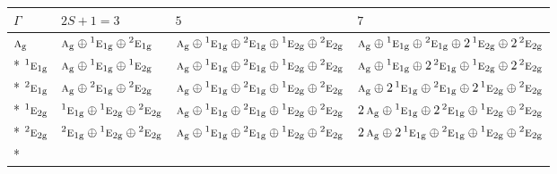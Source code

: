 \documentclass[10pt,a4paper]{article}
\numberwithin{equation}{section}
\newcommand{\irr}[1]{\text{\normalfont\scshape #1}}
\newcommand{\conjpair}[1]{{}^{#1}}
\newcommand{\ptag}[1]{\mathrm{#1}}
\begin{document}
{\small\setlength{\tabcolsep}{3pt}\begin{longtable}{@{}llll@{}}\toprule
$\Gamma$ & $2S + 1 = 3$ & $5$ & $7$\\\midrule\endhead
\bottomrule\endfoot\endlastfoot
$\irr{a}_{\ptag{g}}$ & $\irr{a}_{\ptag{g}}\oplus \conjpair{1}\irr{e}_{1\ptag{g}}\oplus \conjpair{2}\irr{e}_{1\ptag{g}}$ & $\irr{a}_{\ptag{g}}\oplus \conjpair{1}\irr{e}_{1\ptag{g}}\oplus \conjpair{2}\irr{e}_{1\ptag{g}}\oplus \conjpair{1}\irr{e}_{2\ptag{g}}\oplus \conjpair{2}\irr{e}_{2\ptag{g}}$ & $\irr{a}_{\ptag{g}}\oplus \conjpair{1}\irr{e}_{1\ptag{g}}\oplus \conjpair{2}\irr{e}_{1\ptag{g}}\oplus 2\,\conjpair{1}\irr{e}_{2\ptag{g}}\oplus 2\,\conjpair{2}\irr{e}_{2\ptag{g}}$\\*
$\conjpair{1}\irr{e}_{1\ptag{g}}$ & $\irr{a}_{\ptag{g}}\oplus \conjpair{1}\irr{e}_{1\ptag{g}}\oplus \conjpair{1}\irr{e}_{2\ptag{g}}$ & $\irr{a}_{\ptag{g}}\oplus \conjpair{1}\irr{e}_{1\ptag{g}}\oplus \conjpair{2}\irr{e}_{1\ptag{g}}\oplus \conjpair{1}\irr{e}_{2\ptag{g}}\oplus \conjpair{2}\irr{e}_{2\ptag{g}}$ & $\irr{a}_{\ptag{g}}\oplus \conjpair{1}\irr{e}_{1\ptag{g}}\oplus 2\,\conjpair{2}\irr{e}_{1\ptag{g}}\oplus \conjpair{1}\irr{e}_{2\ptag{g}}\oplus 2\,\conjpair{2}\irr{e}_{2\ptag{g}}$\\*
$\conjpair{2}\irr{e}_{1\ptag{g}}$ & $\irr{a}_{\ptag{g}}\oplus \conjpair{2}\irr{e}_{1\ptag{g}}\oplus \conjpair{2}\irr{e}_{2\ptag{g}}$ & $\irr{a}_{\ptag{g}}\oplus \conjpair{1}\irr{e}_{1\ptag{g}}\oplus \conjpair{2}\irr{e}_{1\ptag{g}}\oplus \conjpair{1}\irr{e}_{2\ptag{g}}\oplus \conjpair{2}\irr{e}_{2\ptag{g}}$ & $\irr{a}_{\ptag{g}}\oplus 2\,\conjpair{1}\irr{e}_{1\ptag{g}}\oplus \conjpair{2}\irr{e}_{1\ptag{g}}\oplus 2\,\conjpair{1}\irr{e}_{2\ptag{g}}\oplus \conjpair{2}\irr{e}_{2\ptag{g}}$\\*
$\conjpair{1}\irr{e}_{2\ptag{g}}$ & $\conjpair{1}\irr{e}_{1\ptag{g}}\oplus \conjpair{1}\irr{e}_{2\ptag{g}}\oplus \conjpair{2}\irr{e}_{2\ptag{g}}$ & $\irr{a}_{\ptag{g}}\oplus \conjpair{1}\irr{e}_{1\ptag{g}}\oplus \conjpair{2}\irr{e}_{1\ptag{g}}\oplus \conjpair{1}\irr{e}_{2\ptag{g}}\oplus \conjpair{2}\irr{e}_{2\ptag{g}}$ & $2\,\irr{a}_{\ptag{g}}\oplus \conjpair{1}\irr{e}_{1\ptag{g}}\oplus 2\,\conjpair{2}\irr{e}_{1\ptag{g}}\oplus \conjpair{1}\irr{e}_{2\ptag{g}}\oplus \conjpair{2}\irr{e}_{2\ptag{g}}$\\*
$\conjpair{2}\irr{e}_{2\ptag{g}}$ & $\conjpair{2}\irr{e}_{1\ptag{g}}\oplus \conjpair{1}\irr{e}_{2\ptag{g}}\oplus \conjpair{2}\irr{e}_{2\ptag{g}}$ & $\irr{a}_{\ptag{g}}\oplus \conjpair{1}\irr{e}_{1\ptag{g}}\oplus \conjpair{2}\irr{e}_{1\ptag{g}}\oplus \conjpair{1}\irr{e}_{2\ptag{g}}\oplus \conjpair{2}\irr{e}_{2\ptag{g}}$ & $2\,\irr{a}_{\ptag{g}}\oplus 2\,\conjpair{1}\irr{e}_{1\ptag{g}}\oplus \conjpair{2}\irr{e}_{1\ptag{g}}\oplus \conjpair{1}\irr{e}_{2\ptag{g}}\oplus \conjpair{2}\irr{e}_{2\ptag{g}}$\\*

\end{longtable}}
\end{document}

